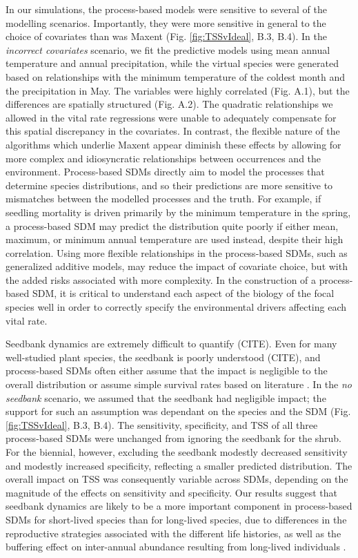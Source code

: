 \documentclass[preprint,review,times,12pt]{elsarticle}
\begin{document}
In our simulations, the process-based models were sensitive to several of the modelling scenarios. Importantly, they were more sensitive in general to the choice of covariates than was Maxent (Fig. \ref{fig:TSSvIdeal}, B.3, B.4). In the \emph{incorrect covariates} scenario, we fit the predictive models using mean annual temperature and annual precipitation, while the virtual species were generated based on relationships with the minimum temperature of the coldest month and the precipitation in May. The variables were highly correlated (Fig. A.1), but the differences are spatially structured (Fig. A.2). The quadratic relationships we allowed in the vital rate regressions were unable to adequately compensate for this spatial discrepancy in the covariates. In contrast, the flexible nature of the algorithms which underlie Maxent appear diminish these effects by allowing for more complex and idiosyncratic relationships between occurrences and the environment. Process-based SDMs directly aim to model the processes that determine species distributions, and so their predictions are more sensitive to mismatches between the modelled processes and the truth. For example, if seedling mortality is driven primarily by the minimum temperature in the spring, a process-based SDM may predict the distribution quite poorly if either mean, maximum, or minimum annual temperature are used instead, despite their high correlation. Using more flexible relationships in the process-based SDMs, such as generalized additive models, may reduce the impact of covariate choice, but with the added risks associated with more complexity. In the construction of a process-based SDM, it is critical to understand each aspect of the biology of the focal species well in order to correctly specify the environmental drivers affecting each vital rate.

Seedbank dynamics are extremely difficult to quantify (CITE). Even for many well-studied plant species, the seedbank is poorly understood (CITE), and process-based SDMs often either assume that the impact is negligible to the overall distribution \citep{Merow2017} or assume simple survival rates based on literature \citep{Szewczyk2019}. In the \emph{no seedbank} scenario, we assumed that the seedbank had negligible impact; the support for such an assumption was dependant on the species and the SDM (Fig. \ref{fig:TSSvIdeal}, B.3, B.4). The sensitivity, specificity, and TSS of all three process-based SDMs were unchanged from ignoring the seedbank for the shrub. For the biennial, however, excluding the seedbank modestly decreased sensitivity and modestly increased specificity, reflecting a smaller predicted distribution. The overall impact on TSS was consequently variable across SDMs, depending on the magnitude of the effects on sensitivity and specificity. Our results suggest that seedbank dynamics are likely to be a more important component in process-based SDMs for short-lived species than for long-lived species, due to differences in the reproductive strategies associated with the different life histories, as well as the buffering effect on inter-annual abundance resulting from long-lived individuals \citep{Morris2003}.
\end{document}

